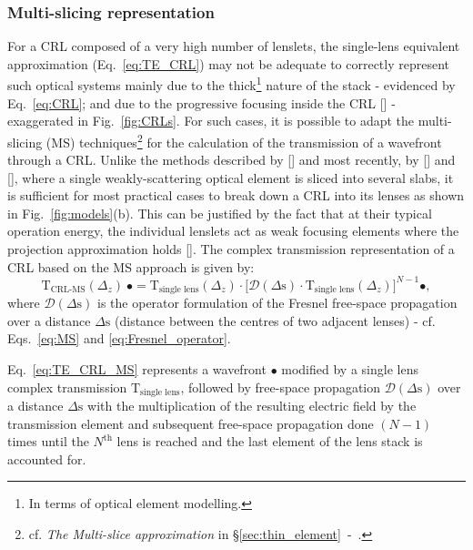 \begin{refsection}
\subsubsection*{Multi-slicing representation}

For a CRL composed of a very high number of lenslets, the single-lens equivalent approximation (Eq.~\ref{eq:TE_CRL}) may not be adequate to correctly represent such optical systems mainly due to the thick\footnote{In terms of optical element modelling.} nature of the stack  - evidenced by Eq.~\ref{eq:CRL}; and due to the progressive focusing inside the CRL [\cite{Schroer2005}] - exaggerated in Fig.~\ref{fig:CRLs}. For such cases, it is possible to adapt the multi-slicing (MS) techniques\footnote{cf. \textit{The Multi-slice approximation} in \S\ref{sec:thin_element}~-~\textit{}.} for the calculation of the transmission of a wavefront through a CRL. Unlike the methods described by [\cite{Paganin2006}] and most recently, by [\cite{Li2017}] and [\cite{Munro2019}], where a single weakly-scattering optical element is sliced into several slabs, it is sufficient for most practical cases to break down a CRL into its lenses as shown in  Fig.~\ref{fig:models}(b). This can be justified by the fact that at their typical operation energy, the individual lenslets act as weak focusing elements where the projection approximation holds [\cite{Protopopov1998}]. The complex transmission representation of a CRL based on the MS approach is given by:
\begin{equation}\label{eq:TE_CRL_MS}
    \mathrm{T}_{\text{CRL-MS}}(\Delta_z)~\bullet = \mathrm{T}_{\text{single lens}}(\Delta_z)\cdot\big[\mathcal{D}({\Delta}\text{s})\cdot\mathrm{T}_{\text{single lens}}(\Delta_z)\big]^{N-1}\bullet,
\end{equation}{}
where $\mathcal{D}({\Delta}\text{s})$ is the operator formulation of the Fresnel free-space propagation over a distance $\Delta\text{s}$ (distance between the centres of two adjacent lenses) - cf. Eqs.~\ref{eq:MS} and \ref{eq:Fresnel_operator}. 

Eq.~\ref{eq:TE_CRL_MS} represents a wavefront $\bullet$ modified by a single lens complex transmission $\mathrm{T}_{\text{single lens}}$, followed by free-space propagation $\mathcal{D}({\Delta}\text{s})$ over a distance $\Delta \text{s}$ with the multiplication of the resulting electric field by the transmission element and subsequent free-space propagation done $(N-1)$ times until the $N^{\text{th}}$ lens is reached and the last element of the lens stack is accounted for.


\end{refsection}
